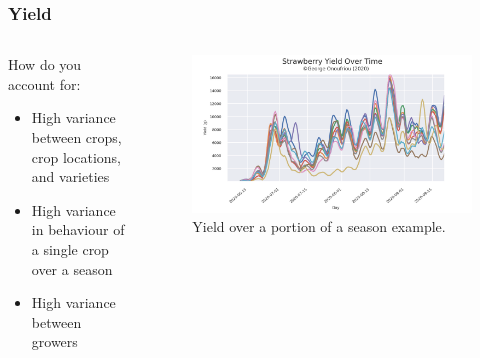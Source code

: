 \documentclass[aspectratio=169]{beamer}
\begin{document}
  \begin{frame}
    \frametitle{Yield}
    \begin{columns}
      \begin{column}{0.3\textwidth}
        How do you account for:
        \begin{itemize}
          \item High variance between crops, crop locations, and varieties
          \item High variance in behaviour of a single crop over a season
          \item High variance between growers
        \end{itemize}
      \end{column}
      \begin{column}{0.7\textwidth}
        \begin{figure}[th!]
          \centering
          \includegraphics[width=1\textwidth]{yield.png}
          \caption{Yield over a portion of a season example. \autocite{repository}}
          \label{fig:yield}
        \end{figure}
      \end{column}
    \end{columns}
  \end{frame}
\end{document}

